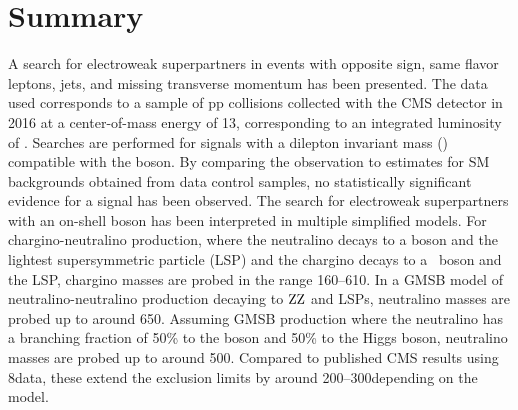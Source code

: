 \section{Summary}
\noindent
\justify
A search for electroweak superpartners in events with opposite sign, same flavor leptons, jets, and missing transverse momentum has been presented. 
The data used corresponds to a sample of pp collisions collected with the CMS detector in 2016 at a center-of-mass energy of 13\TeV, corresponding to an integrated luminosity of \lint.
Searches are performed for signals with a dilepton invariant mass (\mll) compatible with the \PZ boson.
By comparing the observation to estimates for SM backgrounds obtained from data control samples, no statistically significant evidence for a signal has been observed.
The search for electroweak superpartners with an on-shell \PZ boson has been interpreted in multiple simplified models.
For chargino-neutralino production, where the neutralino decays to a \PZ boson and the lightest supersymmetric particle (LSP) and the chargino decays to a \PW\ boson and the LSP, chargino masses are probed in the range 160--610\GeV.
In a GMSB model of neutralino-neutralino production decaying to $\mathrm{Z}\mathrm{Z}$ and LSPs, neutralino masses are probed up to around 650\GeV.
Assuming GMSB production where the neutralino has a branching fraction of 50\% to the \PZ boson and 50\% to the Higgs boson, neutralino masses are probed up to around 500\GeV.
Compared to published CMS results using 8\TeV data, these extend the exclusion limits by around 200--300\GeV depending on the model.
